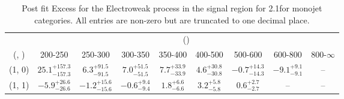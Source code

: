 \begin{table}[h!]
\tiny
\centering
\caption{Post fit Excess for the Electroweak process in the signal region for 2.1\ifb for monojet categories. All entries are non-zero but are truncated to one decimal place.\label{tab:excessseppost_sig_ewk_mono}}
\begin{tabular}
{ccccccccc}
	\hline\hline
	& \multicolumn{8}{c}{\scalht (\gev)} \\ 
	 (\njet,  \nb) & 200-250 & 250-300 & 300-350 & 350-400 & 400-500 & 500-600 & 600-800 & 800-$\infty$ \\ [0.8ex] 
\hline
	(1, 0) & $25.1^{+ 157.3 }_{- 157.3 }$ & $6.3^{+ 91.5 }_{- 91.5 }$ & $7.0^{+ 51.5 }_{- 51.5 }$ & $7.7^{+ 33.9 }_{- 33.9 }$ & $4.6^{+ 30.8 }_{- 30.8 }$ & $-0.7^{+ 14.3 }_{- 14.3 }$ & $-9.1^{+ 9.1 }_{- 9.1 }$ & -- \\[0.5ex] 
	(1, 1) & $-5.9^{+ 26.6 }_{- 26.6 }$ & $-1.2^{+ 15.6 }_{- 15.6 }$ & $-0.6^{+ 9.4 }_{- 9.4 }$ & $1.8^{+ 6.6 }_{- 6.6 }$ & $3.2^{+ 5.8 }_{- 5.8 }$ & $0.6^{+ 2.7 }_{- 2.7 }$ & -- & -- \\[0.5ex] 
	\hline
	\hline
\end{tabular}
\end{table}
